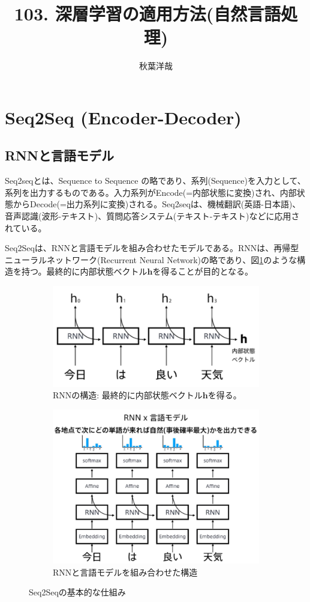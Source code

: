 \documentclass{ltjsarticle}
\begin{document}
\title{103. 深層学習の適用方法(自然言語処理)}
\author{秋葉洋哉}
\maketitle

\section{Seq2Seq (Encoder-Decoder)}
\subsection{RNNと言語モデル}
Seq2seqとは、Sequence to Sequence の略であり、系列(Sequence)を入力として、系列を出力するものである。入力系列がEncode(=内部状態に変換)され、内部状態からDecode(=出力系列に変換)される。Seq2seqは、機械翻訳(英語-日本語)、音声認識(波形-テキスト)、質問応答システム(テキスト-テキスト)などに応用されている。
\par
Seq2Seqは、RNNと言語モデルを組み合わせたモデルである。RNNは、再帰型ニューラルネットワーク(Recurrent Neural Network)の略であり、図\ref{fig:RNN}のような構造を持つ。最終的に内部状態ベクトル$\mathbf{h}$を得ることが目的となる。
\begin{figure}[htbp]
  \centering
  \begin{subfigure}[b]{0.45\textwidth}
    \centering
    \includegraphics[width=0.8\linewidth]{./capture/RNN.png}
    \caption{RNNの構造: 最終的に内部状態ベクトル$\mathbf{h}$を得る。}
    \label{fig:RNN}
  \end{subfigure}
  \hfill
  \begin{subfigure}[b]{0.45\textwidth}
    \centering
    \includegraphics[width=0.8\linewidth]{./capture/RNN&LangModel.png}
    \caption{RNNと言語モデルを組み合わせた構造}
    \label{fig:RNN&LangModel}
  \end{subfigure}
  \caption{Seq2Seqの基本的な仕組み}
\end{figure}
\end{document}
